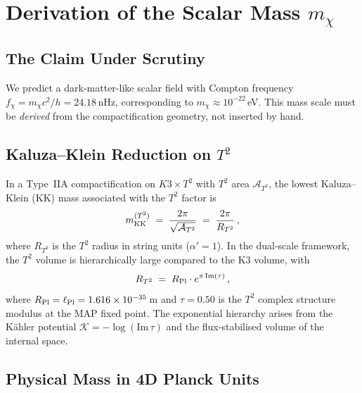 \section{Derivation of the Scalar Mass $m_\chi$}
\label{sec:mass_derivation}

\subsection{The Claim Under Scrutiny}

We predict a dark-matter-like scalar field with Compton frequency $f_\chi = m_\chi c^2 / h = 24.18\,$nHz, corresponding to $m_\chi \approx 10^{-22}\,$eV.  This mass scale must be \emph{derived} from the compactification geometry, not inserted by hand.

\subsection{Kaluza--Klein Reduction on $T^2$}

In a Type~IIA compactification on $K3 \times T^2$ with $T^2$ area $\mathcal{A}_{T^2}$, the lowest Kaluza--Klein (KK) mass associated with the $T^2$ factor is
\begin{equation}
    m_{\rm KK}^{(T^2)} \;=\; \frac{2\pi}{\sqrt{\mathcal{A}_{T^2}}} \;=\; \frac{2\pi}{R_{T^2}}\,,
    \label{eq:KK_mass}
\end{equation}
where $R_{T^2}$ is the $T^2$ radius in string units ($\alpha' = 1$).  In the dual-scale framework, the $T^2$ volume is hierarchically large compared to the K3 volume, with
\begin{equation}
    R_{T^2} \;=\; R_{\rm Pl} \cdot e^{\pi\,\mathrm{Im}(\tau)}\,,
    \label{eq:T2_radius}
\end{equation}
where $R_{\rm Pl} = \ell_{\rm Pl} = 1.616 \times 10^{-35}\,$m and $\tau = 0.50$ is the $T^2$ complex structure modulus at the MAP fixed point.  The exponential hierarchy arises from the K\"ahler potential $\mathcal{K} = -\log(\mathrm{Im}\,\tau)$ and the flux-stabilised volume of the internal space.

\subsection{Physical Mass in 4D Planck Units}


